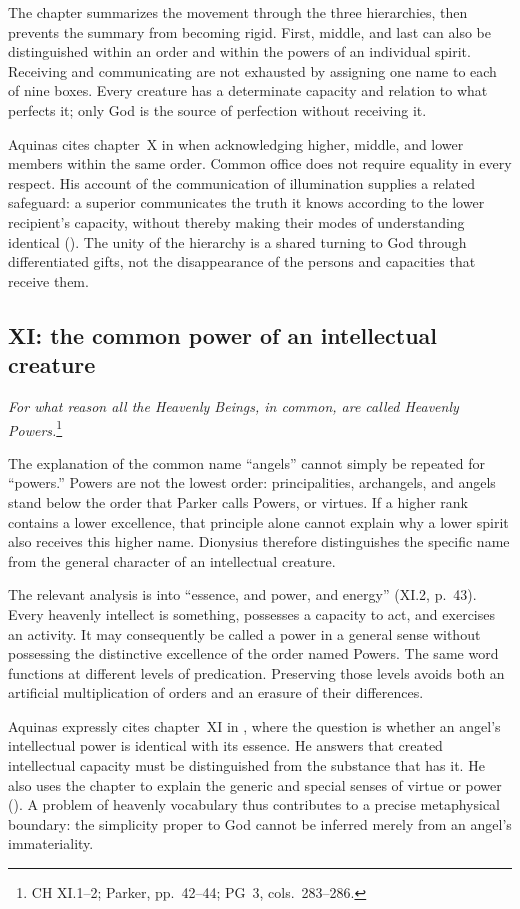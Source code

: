 The chapter summarizes the movement through the three hierarchies, then prevents the summary from becoming rigid. First, middle, and last can also be distinguished within an order and within the powers of an individual spirit. Receiving and communicating are not exhausted by assigning one name to each of nine boxes. Every creature has a determinate capacity and relation to what perfects it; only God is the source of perfection without receiving it.

Aquinas cites chapter~X in  when acknowledging higher, middle, and lower members within the same order. Common office does not require equality in every respect. His account of the communication of illumination supplies a related safeguard: a superior communicates the truth it knows according to the lower recipient's capacity, without thereby making their modes of understanding identical (). The unity of the hierarchy is a shared turning to God through differentiated gifts, not the disappearance of the persons and capacities that receive them.

\subsection{XI: the common power of an intellectual creature}
\emph{For what reason all the Heavenly Beings, in common, are called Heavenly Powers.}\footnote{CH XI.1--2; Parker, pp.~42--44; PG~3, cols.~283--286.}

The explanation of the common name ``angels'' cannot simply be repeated for ``powers.'' Powers are not the lowest order: principalities, archangels, and angels stand below the order that Parker calls Powers, or virtues. If a higher rank contains a lower excellence, that principle alone cannot explain why a lower spirit also receives this higher name. Dionysius therefore distinguishes the specific name from the general character of an intellectual creature.

The relevant analysis is into ``essence, and power, and energy'' (XI.2, p.~43). Every heavenly intellect is something, possesses a capacity to act, and exercises an activity. It may consequently be called a power in a general sense without possessing the distinctive excellence of the order named Powers. The same word functions at different levels of predication. Preserving those levels avoids both an artificial multiplication of orders and an erasure of their differences.

Aquinas expressly cites chapter~XI in , where the question is whether an angel's intellectual power is identical with its essence. He answers that created intellectual capacity must be distinguished from the substance that has it. He also uses the chapter to explain the generic and special senses of virtue or power (). A problem of heavenly vocabulary thus contributes to a precise metaphysical boundary: the simplicity proper to God cannot be inferred merely from an angel's immateriality.

